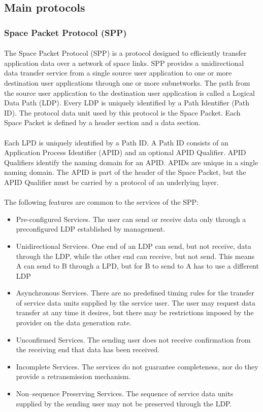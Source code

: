 \documentclass[12pt,a4paper]{report}
\begin{document}
\subsection{Main protocols}

\subsubsection{Space Packet Protocol (SPP)\cite{SPP}}
\paragraph{}The Space Packet Protocol (SPP) is a protocol designed to efficiently transfer application data over a network of space links. SPP provides a unidirectional data transfer service from a single source user application to one or more destination user applications through one or more subnetworks. The path from the source user application to the destination user application is called a Logical Data Path (LDP). Every LDP is uniquely identified by a Path Identifier (Path ID). The protocol data unit used by this protocol is the Space Packet. Each Space Packet is defined by a header section and a data section.
\paragraph{}Each LPD is uniquely identified by a Path ID. A Path ID consists of an Application Process Identifier (APID) and an optional APID Qualifier. APID Qualifiers identify the naming domain for an APID. APIDs are unique in a single naming domain. The APID is part of the header of the Space Packet, but the APID Qualifier must be carried by a protocol of an underlying layer.
\paragraph{}The following features are common to the services of the SPP:
\begin{itemize}
\item Pre-configured Services. The user can send or receive data only through a preconfigured LDP established by management.
\item Unidirectional Services. One end of an LDP can send, but not receive, data through the LDP, while the other end can receive, but not send. This means A can send to B through a LPD, but for B to send to A has to use a different LDP
\item Asynchronous Services. There are no predefined timing rules for the transfer of service data units supplied by the service user. The user may request data transfer at any time it desires, but there may be restrictions imposed by the provider on the data generation rate.
\item Unconfirmed Services. The sending user does not receive confirmation from the receiving end that data has been received.
\item Incomplete Services. The services do not guarantee completeness, nor do they provide a retransmission mechanism.
\item Non–sequence Preserving Services. The sequence of service data units supplied by the sending user may not be preserved through the LDP.
\end{itemize}
\end{document}
